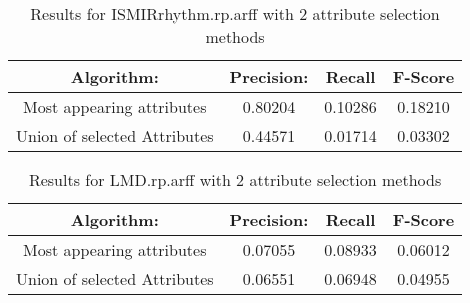 \begin{table}[p]
\begin{center}
\begin{tabular}{|c|c|c|c|}
\hline Algorithm: & Precision: & Recall & F-Score\\
\hline Most appearing attributes & 0.80204 & 0.10286 & 0.18210\\
\hline Union of selected Attributes & 0.44571 & 0.01714 & 0.03302\\

\hline
\end{tabular}
\caption{Results for ISMIRrhythm.rp.arff with 2 attribute selection methods}
\label{table:classifier:ISMIRrhythm2}
\end{center}
\end{table}


\begin{table}[p]
\begin{center}
\begin{tabular}{|c|c|c|c|}
\hline Algorithm: & Precision: & Recall & F-Score\\
\hline Most appearing attributes & 0.07055 & 0.08933 & 0.06012\\
\hline Union of selected Attributes & 0.06551 & 0.06948 & 0.04955\\

\hline
\end{tabular}
\caption{Results for LMD.rp.arff with 2 attribute selection methods}
\label{table:classifier:LMD2}
\end{center}
\end{table}

